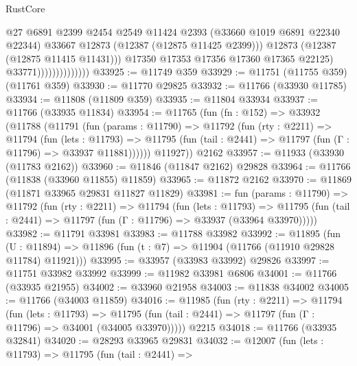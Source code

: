 \begin{lexlean}{RustCore}
\begin{coremodule}
                                      @27
                                      @6891
                                      @2399
                                      @2454
                                      @2549
                                      @11424
                                      @2393
                                      (@33660 @1019 @6891 @22340 @22344)
                                      @33667
                                      @12873
                                      (@12387 (@12875 @11425 @2399)))
                                    @12873
                                    (@12387 (@12875 @11415 @11431)))
                                  @17350
                                  @17353
                                  @17356
                                  @17360
                                  @17365
                                  @22125)
                                @33771))))))))))))))
@33925 := @11749 @359
@33929 := @11751 (@11755 @359) (@11761 @359)
@33930 := @11770 @29825
@33932 := @11766 (@33930 @11785)
@33934 := @11808 (@11809 @359)
@33935 := @11804 @33934
@33937 := @11766 (@33935 @11834)
@33954 := @11765
    (fun (fn : @152) =>
    @33932
      (@11788
        (@11791
          (fun (params : @11790) =>
          @11792
            (fun (rty : @2211) =>
            @11794
              (fun (lets : @11793) =>
              @11795 (fun (tail : @2441) => @11797 (fun (Γ : @11796) => @33937 @11881))))))
        @11927))
    @2162
@33957 := @11933 (@33930 (@11783 @2162))
@33960 := @11846 (@11847 @2162) @29828
@33964 := @11766 (@11838 (@33960 @11855) @11859)
@33965 := @11872 @2162
@33970 := @11869 (@11871 @33965 @29831 @11827 @11829)
@33981 := fun (params : @11790) =>
  @11792
    (fun (rty : @2211) =>
    @11794
      (fun (lets : @11793) =>
      @11795 (fun (tail : @2441) => @11797 (fun (Γ : @11796) => @33937 (@33964 @33970)))))
@33982 := @11791 @33981
@33983 := @11788 @33982
@33992 := @11895
    (fun (U : @11894) => @11896 (fun (t : @7) => @11904 (@11766 (@11910 @29828 @11784) @11921)))
@33995 := @33957 (@33983 @33992) @29826
@33997 := @11751 @33982 @33992
@33999 := @11982 @33981 @6806
@34001 := @11766 (@33935 @21955)
@34002 := @33960 @21958
@34003 := @11838 @34002
@34005 := @11766 (@34003 @11859)
@34016 := @11985
    (fun (rty : @2211) =>
    @11794
      (fun (lets : @11793) =>
      @11795 (fun (tail : @2441) => @11797 (fun (Γ : @11796) => @34001 (@34005 @33970)))))
    @2215
@34018 := @11766 (@33935 @32841)
@34020 := @28293 @33965 @29831
@34032 := @12007
    (fun (lets : @11793) =>
    @11795
      (fun (tail : @2441) =>

\end{coremodule}
\end{lexlean}
